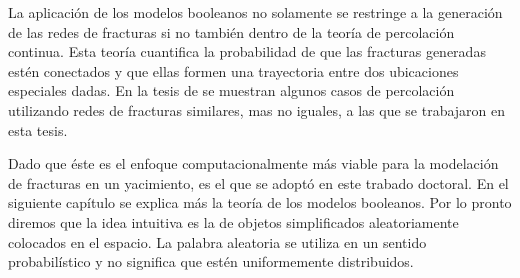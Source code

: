 La aplicaci\'on de los modelos booleanos no solamente se restringe a la generaci\'on de las redes de fracturas si no tambi\'en dentro de la teor\'ia de percolaci\'on continua. Esta teor\'ia cuantifica la probabilidad de que las fracturas generadas est\'en conectados y que ellas formen una trayectoria entre dos ubicaciones especiales dadas. En la tesis de \citet{ayala-garcia_estimacion_2014} se muestran algunos casos de percolaci\'on utilizando redes de fracturas similares, mas no iguales, a las que se trabajaron en esta tesis.

Dado que \'este es el enfoque computacionalmente m\'as viable para la modelaci\'on de fracturas en un yacimiento, es el que se adopt\'o en este trabado doctoral. En el siguiente cap\'itulo se explica m\'as la teor\'ia de los modelos booleanos. Por lo pronto diremos que la idea intuitiva es la de objetos simplificados aleatoriamente colocados en el espacio. La palabra aleatoria se utiliza en un sentido probabil\'istico y no significa que est\'en uniformemente distribuidos.

